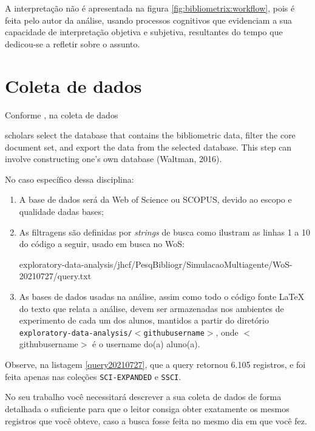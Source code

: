 A interpretação não é apresentada na figura \ref{fig:bibliometrix:workflow}, pois é feita pelo autor da análise, usando processos cognitivos que evidenciam a sua capacidade de interpretação objetiva e subjetiva, resultantes do tempo que dedicou-se a refletir sobre o assunto.

\section{Coleta de dados}

Conforme \cite{aria_bibliometrix_2017},
na coleta de dados 

\begin{itquote}
    scholars select the database that contains the bibliometric data, filter the core document set, and export
the data from the selected database. This step can involve constructing one’s own database (Waltman, 2016).
\end{itquote}

No caso específico dessa disciplina:
\begin{enumerate}
    \item A base de dados será da Web of Science ou SCOPUS, devido ao escopo e qualidade dadas bases;
    \item As filtragens são definidas por \textit{strings} de busca como ilustram as linhas 1 a 10 do código a seguir, usado em busca no WoS:

{exploratory-data-analysis/jhcf/PesqBibliogr/SimulacaoMultiagente/WoS-20210727/query.txt}

\item As bases de dados usadas na análise, assim como todo o código fonte \LaTeX~ do texto que relata a análise, devem ser armazenadas nos ambientes de experimento de cada um dos alunos, mantidos a partir do diretório \texttt{exploratory-data-analysis/$<$githubusername$>$}, onde $<$githubusername$>$ é o username do(a) aluno(a).

\end{enumerate}

Observe, na listagem \ref{query20210727}, que a query retornou 6.105 registros, e foi feita apenas nas coleções \texttt{SCI-EXPANDED} e \texttt{SSCI}.

No seu trabalho você necessitará descrever a sua coleta de dados de forma detalhada o suficiente para que o leitor consiga obter exatamente os mesmos registros que você obteve, caso a busca fosse feita no mesmo dia em que você fez.

